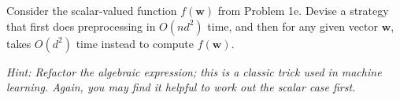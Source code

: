\item {}

Consider the scalar-valued function $f(\mathbf w)$ from Problem 1e. Devise a
strategy that first does preprocessing in $O(n d^2)$ time, and then for any
given vector $\mathbf w$, takes $O(d^2)$ time instead to compute $f(\mathbf w)$.

{\em Hint: Refactor the algebraic expression; this is a classic trick used in machine learning. Again, you may find it helpful to work out the scalar case first.}

